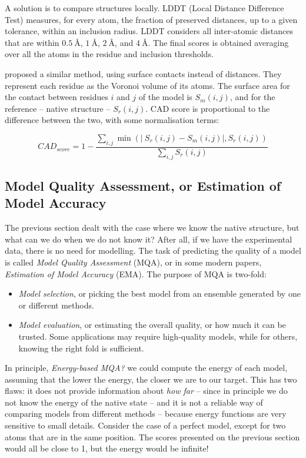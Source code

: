 A solution is to compare structures locally. 
LDDT (Local Distance Difference Test) \citep{lddt} 
measures, for every atom, the fraction of preserved  distances, up to a given tolerance, within an inclusion radius.
LDDT considers all inter-atomic distances that are within $\SI{0.5}{\angstrom}$, $\SI{1}{\angstrom}$, $\SI{2}{\angstrom}$, and $\SI{4}{\angstrom}$.
The final scores is obtained averaging over all the atoms in the residue and inclusion thresholds.

\citet{cad} proposed a similar method, using surface contacts instead of distances. 
They represent each residue as the Voronoi volume of its atoms.
The surface area for the contact between residues $i$ and $j$ of the model is $S_m(i,j)$, and for the reference -- native structure -- $S_r(i,j)$.
CAD score is proportional to the difference between the two, with some normalisation terms:

\begin{equation*}
CAD_{score} = 1 - \frac{\sum_{i,j} \min\left( \left| \: S_{r}(i, j) - S_{m}(i, j)\right|, S_{r}(i, j)\right)}{\sum_{i,j} S_{r}(i, j)}
\end{equation*}

\subsection[Model Quality Assessment]{Model Quality Assessment, or Estimation of Model Accuracy}
The previous section dealt with the case where we know the native structure, but what can we do when we do not know it?
After all, if we have the experimental data, there is no need for modelling.
The task of predicting the quality of a model is called \emph{Model Quality Assessment} (MQA), or in some modern papers, \emph{Estimation of Model Accuracy} (EMA).
The purpose of MQA is two-fold:

\begin{itemize}
\item \emph{Model selection}, or picking the best model from an ensemble generated by one or different methods.
\item \emph{Model evaluation}, or estimating the overall quality, or how much it can be trusted.
Some applications may require high-quality models, while for others, knowing the right fold is sufficient.
\end{itemize}

In principle, \emph{Energy-based MQA?} we could compute the energy of each model, assuming that the lower the energy, the closer we are to our target.
This has two flaws: it does not provide information about \emph{how far} -- since in principle we do not know the energy of the native state -- and it is not a reliable way of comparing models from different methods -- because energy functions are very sensitive to small details.
Consider the case of a perfect model, except for two atoms that are in the same position.
The scores presented on the previous section would all be close to 1, but the energy would be infinite!

